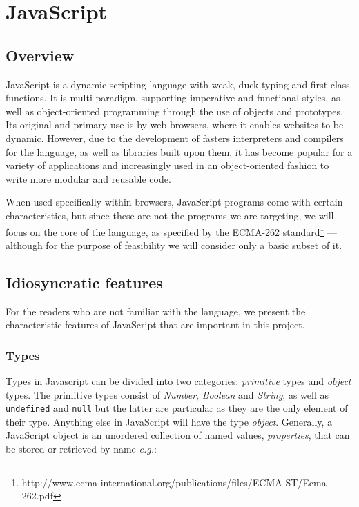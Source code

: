 \documentclass[a4paper,11pt,titlepage]{report}
\begin{document}
\section{JavaScript}
\subsection{Overview}

JavaScript is a dynamic scripting language with weak, duck typing and first-class functions. It is multi-paradigm, supporting imperative and functional styles, as well as object-oriented programming through the use of objects and prototypes. Its original and primary use is by web browsers, where it enables websites to be dynamic. However, due to the development of fasters interpreters and compilers for the language, as well as libraries built upon them, it has become popular for a variety of applications and increasingly used in an object-oriented fashion to write more modular and reusable code.

When used specifically within browsers, JavaScript programs come with certain characteristics, but since these are not the programs we are targeting, we will focus on the core of the language, as specified by the ECMA-262 standard\footnote{http://www.ecma-international.org/publications/files/ECMA-ST/Ecma-262.pdf} --- although for the purpose of feasibility we will consider only a basic subset of it.

\subsection{Idiosyncratic features}
For the readers who are not familiar with the language, we present the characteristic features of JavaScript \cite{flanagan2006javascript} that are important in this project.

\subsubsection{Types}
Types in Javascript can be divided into two categories: \emph{primitive} types and \emph{object} types. The primitive types consist of \emph{Number}, \emph{Boolean} and \emph{String}, as well as \texttt{undefined} and \texttt{null} but the latter are particular as they are the only element of their type. Anything else in JavaScript will have the type \emph{object}. Generally, a JavaScript object is an unordered collection of named values, \emph{properties}, that can be stored or retrieved by name \emph{e.g.}:
\end{document}
